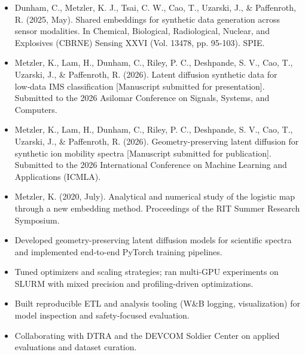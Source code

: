 \documentclass[10pt,a4paper]{altacv}
\begin{document}
\begin{fullwidth}
\begin{itemize}\footnotesize
    \item Dunham, C., Metzler, K. J., Tsai, C. W., Cao, T., Uzarski, J., \& Paffenroth, R. (2025, May). Shared embeddings for synthetic data generation across sensor modalities. In Chemical, Biological, Radiological, Nuclear, and Explosives (CBRNE) Sensing XXVI (Vol. 13478, pp. 95-103). SPIE.
    \item Metzler, K., Lam, H., Dunham, C., Riley, P. C., Deshpande, S. V., Cao, T., Uzarski, J., \& Paffenroth, R. (2026). Latent diffusion synthetic data for low‑data IMS classification [Manuscript submitted for presentation]. Submitted to the 2026 Asilomar Conference on Signals, Systems, and Computers.
    \item Metzler, K., Lam, H., Dunham, C., Riley, P. C., Deshpande, S. V., Cao, T., Uzarski, J., \& Paffenroth, R. (2026). Geometry-preserving latent diffusion for synthetic ion mobility spectra [Manuscript submitted for publication]. Submitted to the 2026 International Conference on Machine Learning and Applications (ICMLA).
    \item Metzler, K. (2020, July). Analytical and numerical study of the logistic map through a new embedding method. Proceedings of the RIT Summer Research Symposium. 
\end{itemize}
\end{fullwidth}


\begin{itemize}
    \item Developed geometry-preserving latent diffusion models for scientific spectra and implemented end-to-end PyTorch training pipelines.
    \item Tuned optimizers and scaling strategies; ran multi-GPU experiments on SLURM with mixed precision and profiling-driven optimizations.
    \item Built reproducible ETL and analysis tooling (W\&B logging, visualization) for model inspection and safety-focused evaluation.
    \item Collaborating with DTRA and the DEVCOM Soldier Center on applied evaluations and dataset curation.
\end{itemize}
\end{document}
